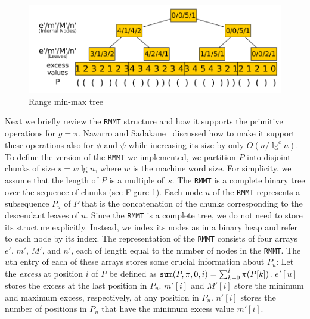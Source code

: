 \begin{figure}[t]
  \centering
  \includegraphics[scale=0.28]{./images/Range-min-max-tree.png}
  \caption{Range min-max tree}
  \label{fig:RangeMinMaxTree}
\vspace{-20pt}
\end{figure}


Next we briefly review the {\tt RMMT} structure and how it supports
the primitive operations for $g = \pi$.  Navarro and
Sadakane~\cite{Navarro:2014:FFS:2620785.2601073} discussed how to make
it support these operations also for $\phi$ and $\psi$ while
increasing its size by only $O(n/\lg^c n)$.  To define the version of
the {\tt RMMT} we implemented, we partition $P$ into disjoint chunks
of size $s = w \lg n$, where $w$ is the machine word size.  For
simplicity, we assume that the length of $P$ is a multiple of~$s$.
The {\tt RMMT} is a complete binary tree over the sequence of
chunks (see Figure \ref{fig:RangeMinMaxTree}). Each node $u$ of the {\tt RMMT} represents a subsequence $P_u$
of $P$ that is the concatenation of the chunks corresponding to the
descendant leaves of $u$.  Since the {\tt RMMT} is a complete tree, we
do not need to store its structure explicitly.  Instead, we index its
nodes as in a binary heap and refer to each node by its index.  The
representation of the {\tt RMMT} consists of four arrays $e'$, $m'$,
$M'$, and $n'$, each of length equal to the number of nodes in the
{\tt RMMT}.  The $u$th entry of each of these arrays stores some
crucial information about $P_u$: Let the {\em excess} at position $i$
of $P$ be defined as $\mathtt{sum}(P,\pi,0,i) = \sum_{k=0}^{i} \pi(P[k])$.
$e'[u]$ stores the excess at the last position in $P_u$.  $m'[i]$ and
$M'[i]$ store the minimum and maximum excess, respectively, at any position in
$P_u$.  $n'[i]$ stores the number of positions in $P_u$ that
have the minimum excess value $m'[i]$.


